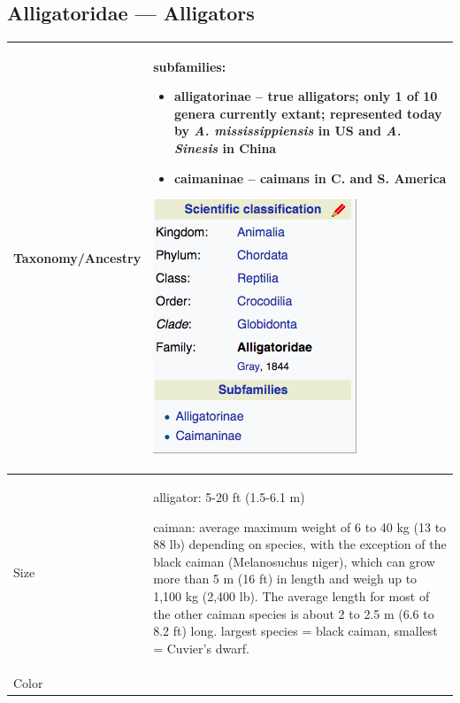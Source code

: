 
\subsection{Alligatoridae --- Alligators}
\begin{center}
\begin{longtabu} to 

	\hline
	Taxonomy/Ancestry &
	subfamilies:
	\begin{itemize}[noitemsep]
		\item \textbf{alligatorinae} -- true alligators; only 1 of 10 genera currently extant; represented today by \emph{A. mississippiensis} in US and \emph{A. Sinesis} in China
		\item \textbf{caimaninae} -- caimans in C. and S. America
	\end{itemize}
	
	\begin{center} \includegraphics[scale=0.5]{crocodylia/alligatoridae/taxonomy} \end{center}
	 \\
	\hline
	Size & 
	alligator: 5-20 ft (1.5-6.1 m)
	
	caiman: average maximum weight of 6 to 40 kg (13 to 88 lb) depending on species, with the exception of the black caiman (Melanosuchus niger), which can grow more than 5 m (16 ft) in length and weigh up to 1,100 kg (2,400 lb). The average length for most of the other caiman species is about 2 to 2.5 m (6.6 to 8.2 ft) long. largest species = black caiman, smallest = Cuvier's dwarf.
	\\
	\hline
	Color &
	

\end{longtabu}
\end{center}
